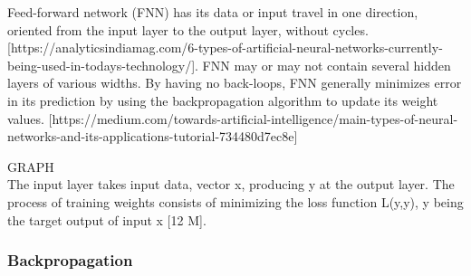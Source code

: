 
Feed-forward network (FNN) has its data or input travel in one direction, oriented from the input layer to the output layer, without cycles. [https://analyticsindiamag.com/6-types-of-artificial-neural-networks-currently-being-used-in-todays-technology/]. FNN may or may not contain several hidden layers of various widths. By having no back-loops, FNN generally minimizes error in its prediction by using the backpropagation algorithm to update its weight values. [https://medium.com/towards-artificial-intelligence/main-types-of-neural-networks-and-its-applications-tutorial-734480d7ec8e]\newline

GRAPH\\

The input layer takes input data, vector x, producing y at the output layer. The process of training weights consists of minimizing the loss function L(y,y), y being the target output of input x [12 M].

\subsubsection{Backpropagation}

